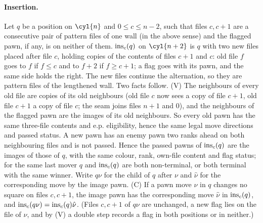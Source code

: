 \paragraph{Insertion.}
Let $q$ be a position on $\cyl{n}$ and $0\le c\le n-2$, such that files $c,c+1$ are a consecutive pair of pattern files of one wall (in the above sense) and the flagged pawn, if
any, is on neither of them. $\operatorname{ins}_c(q)$ on $\cyl{n+2}$ is $q$ with two new files placed after file $c$, holding copies of the contents
of files $c+1$ and $c$: old file $f$ goes to $f$ if $f\le c$ and to $f+2$ if $f\ge c+1$; a flag goes with its pawn, and the same side
holds the right. The new files continue the alternation, so they are pattern files of the lengthened wall. Two facts follow.
(V) The neighbours of every old file are copies of its old neighbours (old file $c$ now sees a copy of file $c+1$, old file $c+1$ a copy
of file $c$; the seam joins files $n+1$ and $0$), and the neighbours of the flagged pawn are the images of its old neighbours. So every old pawn has the same three-file contents and
e.p. eligibility, hence the same legal move directions and passed status. A new pawn has an enemy pawn two ranks ahead on both neighbouring files and is
not passed. Hence the passed pawns of $\operatorname{ins}_c(q)$ are the images of those of $q$, with the same colour, rank, own-file content and
flag status; for the same last mover $q$ and $\operatorname{ins}_c(q)$ are both non-terminal, or both terminal with the same winner.
Write $q\nu$ for the child of $q$ after $\nu$ and $\hat\nu$ for the corresponding move by the image pawn.
(C) If a pawn move $\nu$ in $q$ changes no square on files $c,c+1$, the image pawn has the corresponding move $\hat\nu$ in $\operatorname{ins}_c(q)$, and
$\operatorname{ins}_c(q\nu)=\operatorname{ins}_c(q)\hat\nu$. (Files $c,c+1$ of $q\nu$ are unchanged, a new flag lies on the file of $\nu$, and by (V) a double step
records a flag in both positions or in neither.)

